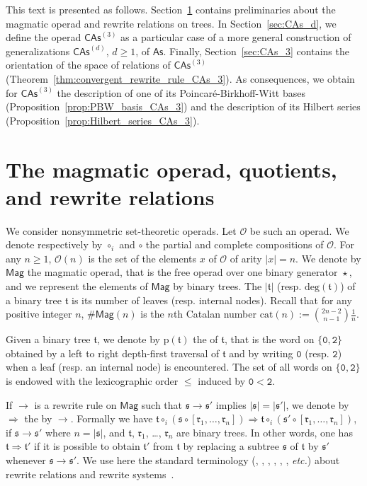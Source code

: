 \documentclass[10pt,reqno]{amsart}
\numberwithin{equation}{subsection}
\renewcommand{\leq}{\leqslant}
\renewcommand{\geq}{\geqslant}
\newcommand{\Oca}{\mathcal{O}}
\newcommand{\Rfr}{\mathfrak{r}}
\newcommand{\Sfr}{\mathfrak{s}}
\newcommand{\Tfr}{\mathfrak{t}}
\newcommand{\Zero}{\mathtt{0}}
\newcommand{\Two}{\mathtt{2}}
\newcommand{\Mag}{\mathsf{Mag}}
\newcommand{\As}{\mathsf{As}}
\newcommand{\CAs}[1]{\mathsf{CAs}^{(#1)}}
\newcommand{\PrefixWord}{\mathrm{p}}
\newcommand{\Deg}{\mathrm{deg}}
\newcommand{\Catalan}{\mathrm{cat}}
\DeclareMathOperator{\Product}{\star}
\DeclareMathOperator{\Rew}{\to}
\DeclareMathOperator{\RewContext}{\Rightarrow}
\begin{document}
This text is presented as follows. Section~\ref{sec:operad_Mag} contains
preliminaries about the magmatic operad and rewrite relations on trees.
In Section~\ref{sec:CAs_d}, we define the operad $\CAs{3}$ as a
particular case of a more general construction of generalizations
$\CAs{d}$, $d \geq 1$, of $\As$. Finally, Section~\ref{sec:CAs_3}
contains the orientation of the space of relations of
$\CAs{3}$ (Theorem~\ref{thm:convergent_rewrite_rule_CAs_3}). As
consequences, we obtain for $\CAs{3}$
the description of one of its Poincaré-Birkhoff-Witt bases
(Proposition~\ref{prop:PBW_basis_CAs_3}) and the description of
its Hilbert series (Proposition~\ref{prop:Hilbert_series_CAs_3}).
\medbreak

\section{The magmatic operad, quotients, and rewrite relations}
\label{sec:operad_Mag}
We consider nonsymmetric set-theoretic operads. Let $\Oca$ be such an
operad. We denote respectively by $\circ_i$ and $\circ$ the partial and
complete compositions of $\Oca$. For any $n \geq 1$, $\Oca(n)$ is the
set of the elements $x$ of $\Oca$ of arity $|x| = n$. We denote
by $\Mag$ the magmatic operad, that is the free operad over one binary
generator $\Product$, and we represent the elements of $\Mag$ by binary
trees. The  $|\Tfr|$ (resp.  $\Deg(\Tfr)$) of a
binary tree $\Tfr$ is its number of leaves (resp. internal nodes).
Recall that for any positive integer $n$,
$\# \Mag(n)$ is the $n$th Catalan number
$\Catalan(n) := \binom{2n - 2}{n - 1}\frac{1}{n}$.
\medbreak

Given a binary tree $\Tfr$, we denote by $ \PrefixWord(\Tfr)$ the
 of $\Tfr$, that is the word on $\{\Zero, \Two\}$
obtained by a left to right depth-first traversal of $\Tfr$ and by
writing $\Zero$ (resp. $\Two$) when a leaf (resp. an internal node) is
encountered. The set of all words on $\{\Zero, \Two\}$ is endowed with
the lexicographic order $\leq$ induced by $\Zero < \Two$.
\medbreak

If $\Rew$ is a rewrite rule on $\Mag$ such that $\Sfr \Rew \Sfr'$
implies $|\Sfr| = |\Sfr'|$, we denote by $\RewContext$ the
 by $\Rew$. Formally we have
\begin{math}
    \Tfr\circ_i\left(\Sfr\circ\left[\Rfr_1,\dots,\Rfr_{n}\right]\right)
    \RewContext
    \Tfr\circ_i\left(\Sfr'\circ\left[\Rfr_1,\dots,\Rfr_{n}\right]\right)
\end{math},
if $\Sfr \Rew \Sfr'$ where $n = |\Sfr|$, and $\Tfr$, $\Rfr_1$, \dots,
$\Rfr_n$ are binary trees. In other words, one has
$\Tfr \RewContext \Tfr'$ if it is possible to obtain $\Tfr'$ from $\Tfr$
by replacing a subtree $\Sfr$ of $\Tfr$ by $\Sfr'$ whenever
$\Sfr \Rew \Sfr'$. We use here the standard terminology
(, , , , , , {\em etc.}) about rewrite
relations and rewrite systems~\cite{BN98}.
\medbreak
\end{document}
